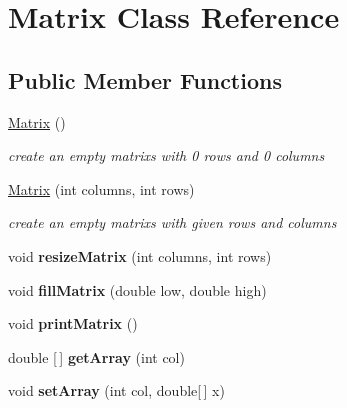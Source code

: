\hypertarget{class_matrix}{}\section{Matrix Class Reference}
\label{class_matrix}
\subsection*{Public Member Functions}
\begin{DoxyCompactItemize}
\item 
\mbox{\hyperlink{class_matrix_afab2892bc6e20ba00745e13efc047f54}{Matrix}} ()
\begin{DoxyCompactList}\small\item\em create an empty matrixs with 0 rows and 0 columns \end{DoxyCompactList}\item 
\mbox{\label{class_matrix_a1398b55f201ff6f18149ee3ddda00fdd}} 
\mbox{\hyperlink{class_matrix_a1398b55f201ff6f18149ee3ddda00fdd}{Matrix}} (int columns, int rows)
\begin{DoxyCompactList}\small\item\em create an empty matrixs with given rows and columns \end{DoxyCompactList}\item 
\mbox{\label{class_matrix_a6efd2e6c98db5faa2b76fe87539534ee}} 
void {\bfseries resize\+Matrix} (int columns, int rows)
\item 
\mbox{\label{class_matrix_a438101103ab44d153e1c737c918e2ee8}} 
void {\bfseries fill\+Matrix} (double low, double high)
\item 
\mbox{\label{class_matrix_abf7c94f23525bc170c62e9699c455dc0}} 
void {\bfseries print\+Matrix} ()
\item 
\mbox{\label{class_matrix_a248db8e9a85664bdc98d33a46f913d5a}} 
double \mbox{[}$\,$\mbox{]} {\bfseries get\+Array} (int col)
\item 
\mbox{\label{class_matrix_a43b941fa5e5355606b7e59e1bd09a017}} 
void {\bfseries set\+Array} (int col, double\mbox{[}$\,$\mbox{]} x)
\end{DoxyCompactItemize}


